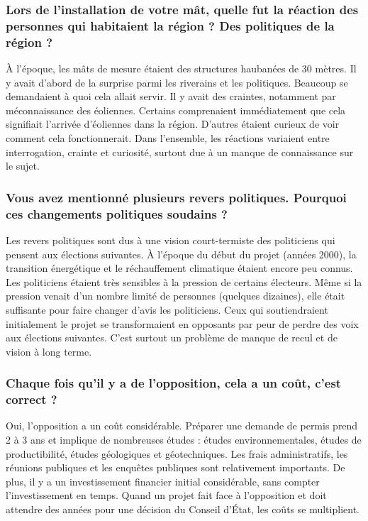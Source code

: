 \subsubsection{Lors de l'installation de votre mât, quelle fut la réaction des personnes qui habitaient la région ? Des politiques de la région ?}

À l'époque, les mâts de mesure étaient des structures haubanées de 30 mètres. Il y avait d'abord de la surprise parmi les riverains et les politiques. Beaucoup se demandaient à quoi cela allait servir. Il y avait des craintes, notamment par méconnaissance des éoliennes. Certains comprenaient immédiatement que cela signifiait l'arrivée d'éoliennes dans la région. D'autres étaient curieux de voir comment cela fonctionnerait. Dans l'ensemble, les réactions variaient entre interrogation, crainte et curiosité, surtout due à un manque de connaissance sur le sujet.

\subsubsection{Vous avez mentionné plusieurs revers politiques. Pourquoi ces changements politiques soudains ?}

Les revers politiques sont dus à une vision court-termiste des politiciens qui pensent aux élections suivantes. À l'époque du début du projet (années 2000), la transition énergétique et le réchauffement climatique étaient encore peu connus. Les politiciens étaient très sensibles à la pression de certains électeurs. Même si la pression venait d'un nombre limité de personnes (quelques dizaines), elle était suffisante pour faire changer d'avis les politiciens. Ceux qui soutiendraient initialement le projet se transformaient en opposants par peur de perdre des voix aux élections suivantes. C'est surtout un problème de manque de recul et de vision à long terme.

\subsubsection{Chaque fois qu'il y a de l'opposition, cela a un coût, c'est correct ?}

Oui, l'opposition a un coût considérable. Préparer une demande de permis prend 2 à 3 ans et implique de nombreuses études : études environnementales, études de productibilité, études géologiques et géotechniques. Les frais administratifs, les réunions publiques et les enquêtes publiques sont relativement importants. De plus, il y a un investissement financier initial considérable, sans compter l'investissement en temps. Quand un projet fait face à l'opposition et doit attendre des années pour une décision du Conseil d'État, les coûts se multiplient.

